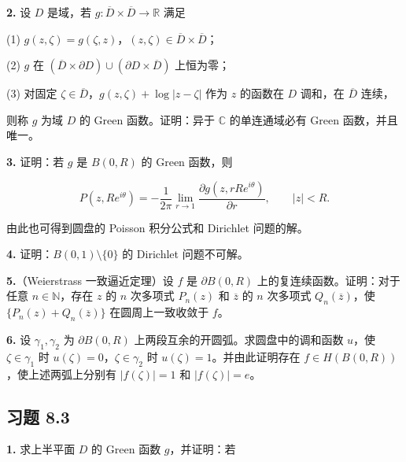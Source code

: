 \documentclass[11pt,a4paper]{article}
\begin{document}
\par{}
\noindent\textbf{2.} 设 \(D\) 是域，若
\(g:\overline D\times\overline D\to\mathbb R\) 满足

(1)
\(g(z,\zeta)=g(\zeta,z)\)，\((z,\zeta)\in\overline D\times\overline D\)；

(2) \(g\) 在
\((\overline D\times\partial D)\cup(\partial D\times\overline D)\)
上恒为零；

(3) 对固定 \(\zeta\in\overline D\)，\(g(z,\zeta)+\log|z-\zeta|\) 作为
\(z\) 的函数在 \(D\) 调和，在 \(\overline D\) 连续，

则称 \(g\) 为域 \(D\) 的 Green 函数。证明：异于 \(\mathbb C\)
的单连通域必有 Green 函数，并且唯一。

\par{}
\noindent\textbf{3.} 证明：若 \(g\) 是 \(B(0,R)\) 的 Green 函数，则

\[
P(z,Re^{i\theta})=-\frac1{2\pi}\lim_{r\to1}\frac{\partial g(z,rRe^{i\theta})}{\partial r},\qquad |z|<R.
\]

由此也可得到圆盘的 Poisson 积分公式和 Dirichlet 问题的解。

\par{}
\noindent\textbf{4.} 证明：\(B(0,1)\setminus\{0\}\) 的 Dirichlet 问题不可解。

\par{}
\noindent\textbf{5.}（Weierstrass 一致逼近定理）设 \(f\) 是 \(\partial B(0,R)\)
上的复连续函数。证明：对于任意 \(n\in\mathbb N\)，存在 \(z\) 的 \(n\)
次多项式 \(P_n(z)\) 和 \(\overline z\) 的 \(n\) 次多项式
\(Q_n(\overline z)\)，使 \(\{P_n(z)+Q_n(\overline z)\}\)
在圆周上一致收敛于 \(f\)。

\par{}
\noindent\textbf{6.} 设 \(\gamma_1,\gamma_2\) 为 \(\partial B(0,R)\)
上两段互余的开圆弧。求圆盘中的调和函数 \(u\)，使 \(\zeta\in\gamma_1\) 时
\(u(\zeta)=0\)，\(\zeta\in\gamma_2\) 时 \(u(\zeta)=1\)。并由此证明存在
\(f\in H(B(0,R))\)，使上述两弧上分别有 \(|f(\zeta)|=1\) 和
\(|f(\zeta)|=e\)。

\subsection{习题 8.3}\label{ch08-practice-heading-4}

\par{}
\noindent\textbf{1.} 求上半平面 \(D\) 的 Green 函数 \(g\)，并证明：若
\end{document}
